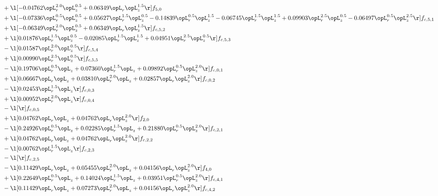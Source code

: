 \begin{alignat}{2}
& + \l[  -0.04762 \opL_r^{2.0} \opL_z^{0.5} +  0.06349 \opL_r \opL_z^{1.5}  \r] f_{5,0} \nonumber \\ 
& + \l[  -0.07336 \opL_r^{0.5} \opL_z^{0.5} +  0.05627 \opL_r^{1.5} \opL_z^{0.5}   -0.14839 \opL_r^{0.5} \opL_z^{1.5}   -0.06745 \opL_r^{1.5} \opL_z^{1.5} +  0.09903 \opL_r^{2.5} \opL_z^{0.5}   -0.06497 \opL_r^{0.5} \opL_z^{2.5}  \r] f_{c,5,1} \nonumber \\ 
& + \l[  -0.06349 \opL_r^{2.0} \opL_z^{0.5} +  0.06349 \opL_r \opL_z^{1.5}  \r] f_{c,5,2} \nonumber \\ 
& + \l[  0.01876 \opL_r^{1.5} \opL_z^{0.5}   -0.02085 \opL_r^{1.5} \opL_z^{1.5} +  0.04951 \opL_r^{2.5} \opL_z^{0.5}  \r] f_{c,5,3} \nonumber \\ 
& - \l[  0.01587 \opL_r^{2.0} \opL_z^{0.5}  \r] f_{c,5,4} \nonumber \\ 
& + \l[  0.00990 \opL_r^{2.5} \opL_z^{0.5}  \r] f_{c,5,5} \nonumber \\ 
& - \l[  0.19706 \opL_r^{0.5} \opL_z +  0.07360 \opL_r^{1.5} \opL_z +  0.09892 \opL_r^{0.5} \opL_z^{2.0}  \r] f_{c,0,1} \nonumber \\ 
& + \l[  0.06667 \opL_r \opL_z +  0.03810 \opL_r^{2.0} \opL_z +  0.02857 \opL_r \opL_z^{2.0}  \r] f_{c,0,2} \nonumber \\ 
& - \l[  0.02453 \opL_r^{1.5} \opL_z  \r] f_{c,0,3} \nonumber \\ 
& + \l[  0.00952 \opL_r^{2.0} \opL_z  \r] f_{c,0,4} \nonumber \\ 
& - \l[  \r] f_{c,0,5} \nonumber \\ 
& + \l[  0.04762 \opL_r \opL_z +  0.04762 \opL_r \opL_z^{2.0}  \r] f_{2,0} \nonumber \\ 
& - \l[  0.24926 \opL_r^{0.5} \opL_z +  0.02285 \opL_r^{1.5} \opL_z +  0.21880 \opL_r^{0.5} \opL_z^{2.0}  \r] f_{c,2,1} \nonumber \\ 
& + \l[  0.04762 \opL_r \opL_z +  0.04762 \opL_r \opL_z^{2.0}  \r] f_{c,2,2} \nonumber \\ 
& - \l[  0.00762 \opL_r^{1.5} \opL_z  \r] f_{c,2,3} \nonumber \\ 
& - \l[  \r] f_{c,2,5} \nonumber \\ 
& - \l[  0.11429 \opL_r \opL_z +  0.05455 \opL_r^{2.0} \opL_z +  0.04156 \opL_r \opL_z^{2.0}  \r] f_{4,0} \nonumber \\ 
& + \l[  0.22649 \opL_r^{0.5} \opL_z +  0.14024 \opL_r^{1.5} \opL_z +  0.03951 \opL_r^{0.5} \opL_z^{2.0}  \r] f_{c,4,1} \nonumber \\ 
& - \l[  0.11429 \opL_r \opL_z +  0.07273 \opL_r^{2.0} \opL_z +  0.04156 \opL_r \opL_z^{2.0}  \r] f_{c,4,2} \nonumber \\ 

\end{alignat}
